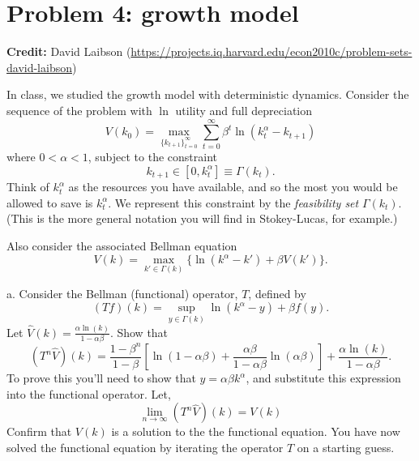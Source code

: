 \documentclass[11pt]{extarticle}
\theoremstyle{plain}
\theoremstyle{definition}
\begin{document}
\vspace{10mm}
\section*{Problem 4: growth model}

\textbf{Credit:} David Laibson (\url{https://projects.iq.harvard.edu/econ2010c/problem-sets-david-laibson})

\vspace{5mm}
\noindent
In class, we studied the growth model with deterministic dynamics. Consider the sequence of the problem with $\ln$ utility and full depreciation
\begin{equation*}
	V(k_0) = \max_{ \{ k_{t+1} \}_{t=0}^\infty} \sum_{t=0}^\infty \beta^t \ln (k_t^\alpha - k_{t+1})
\end{equation*}
where $0 < \alpha < 1$, subject to the constraint
\begin{equation*}
	k_{t+1} \in [0, k_t^\alpha] \equiv \Gamma(k_t).
\end{equation*}
Think of $k_t^\alpha$ as the resources you have available, and so the most you would be allowed to save is $k_t^\alpha$. We represent this constraint by the \textit{feasibility set} $\Gamma(k_t)$. (This is the more general notation you will find in Stokey-Lucas, for example.)

Also consider the associated Bellman equation 
\begin{equation*}
	V(k) = \max_{k' \in \Gamma(k)} \bigg\{ \ln (k^\alpha - k') + \beta V(k') \bigg\}.
\end{equation*}

a. Consider the Bellman (functional) operator, $T$, defined by
$$
(T f)(k)=\sup _{y \in \Gamma(k)} \ln \left(k^\alpha-y\right)+\beta f(y) .
$$
Let $\hat{V}(k)=\frac{\alpha \ln (k)}{1-\alpha \beta}$. Show that
$$
\left(T^n \hat{V}\right)(k)=\frac{1-\beta^n}{1-\beta}\left[\ln (1-\alpha \beta)+\frac{\alpha \beta}{1-\alpha \beta} \ln (\alpha \beta)\right]+\frac{\alpha \ln (k)}{1-\alpha \beta} .
$$
To prove this you'll need to show that $y=\alpha \beta k^\alpha$, and substitute this expression into the functional operator. Let,
$$
\lim _{n \rightarrow \infty}\left(T^n \hat{V}\right)(k)=V(k)
$$
Confirm that $V(k)$ is a solution to the the functional equation. You have now solved the functional equation by iterating the operator $T$ on a starting guess.
\end{document}
